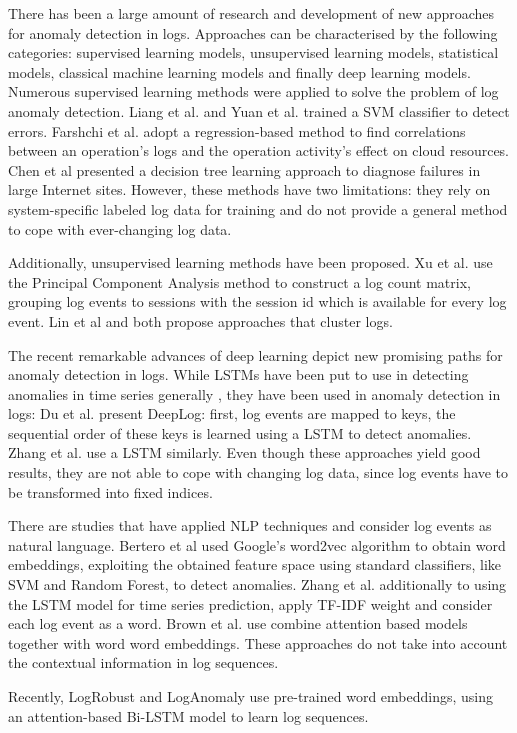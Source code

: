 There has been a large amount of research and development of new approaches for anomaly detection in logs. %
Approaches can be characterised by the following categories: supervised learning models, unsupervised learning models, statistical models, classical machine learning models and finally deep learning models.
Numerous supervised learning methods were applied to solve the problem of log anomaly detection. Liang et al. \cite{liang2007failure} and Yuan et al. \cite{yuan2006automated} trained a SVM classifier to detect errors. Farshchi et al. \cite{farshchi2015anomaly} adopt a regression-based method to find correlations between an operation's logs and the operation activity's effect on cloud resources. Chen et al \cite{chen2004failure} presented a decision tree learning approach to diagnose failures in large Internet sites. However, these methods have two limitations: they rely on system-specific labeled log data for training and do not provide a general method to cope with ever-changing log data.

Additionally, unsupervised learning methods have been proposed. Xu et al. \cite{xu2009detecting} use the Principal Component Analysis method to construct a log count matrix, grouping log events to sessions with the session id which is available for every log event. Lin et al \cite{lin2016log} and \cite{vaarandi2003data} both propose approaches that cluster logs.

The recent remarkable advances of deep learning depict new promising paths for anomaly detection in logs. While LSTMs have been put to use in detecting anomalies in time series generally \cite{malhotra2015long}, they have been used in anomaly detection in logs: Du et al. \cite{du2017deeplog} present DeepLog: first, log events are mapped to keys, the sequential order of these keys is learned using a LSTM to detect anomalies. Zhang et al. \cite{zhang2016automated} use a LSTM similarly. Even though these approaches yield good results, they are not able to cope with changing log data, since log events have to be transformed into fixed indices.

There are studies that have applied NLP techniques and consider log events as natural language. Bertero et al \cite{bertero2017experience} used Google's word2vec algorithm to obtain word embeddings, exploiting the obtained feature space using standard classifiers, like SVM and Random Forest, to detect anomalies. Zhang et al. \cite{zhang2016automated} additionally to using the LSTM model for time series prediction, apply  TF-IDF weight and consider each log event as a word. Brown et al. \cite{brown2018recurrent} use combine attention based models together with word word embeddings. These approaches do not take into account the contextual information in log sequences.

Recently, LogRobust and LogAnomaly use pre-trained word embeddings, using an attention-based Bi-LSTM model to learn log sequences.